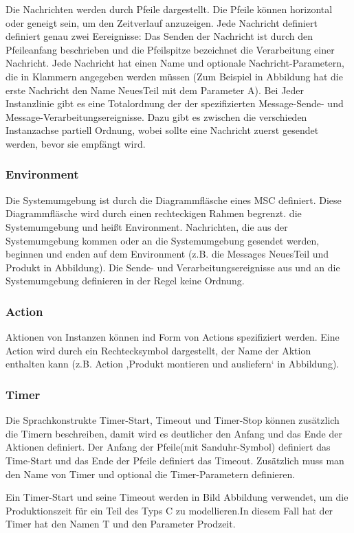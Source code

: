 Die Nachrichten werden durch Pfeile dargestellt. Die Pfeile
können horizontal oder geneigt sein, um den Zeitverlauf
anzuzeigen. 
Jede Nachricht definiert definiert genau zwei Eereignisse: Das Senden der Nachricht ist durch den Pfeileanfang beschrieben und die Pfeilspitze bezeichnet
die Verarbeitung einer Nachricht.
Jede Nachricht hat einen Name und optionale Nachricht-Parametern, die in Klammern angegeben werden müssen (Zum Beispiel in Abbildung hat die erste Nachricht den Name NeuesTeil mit dem Parameter A).
 Bei Jeder Instanzlinie gibt es eine Totalordnung der der spezifizierten
 Message-Sende- und Message-Verarbeitungsereignisse. Dazu gibt es zwischen die verschieden Instanzachse partiell Ordnung, wobei sollte eine Nachricht zuerst gesendet werden, bevor sie empfängt wird. 

\subsubsection{Environment}
Die Systemumgebung ist durch die Diagrammfläsche eines MSC definiert. Diese Diagrammfläsche wird durch einen rechteckigen Rahmen begrenzt.
die Systemumgebung und heißt Environment. Nachrichten,
die aus der Systemumgebung kommen oder an die Systemumgebung
gesendet werden, beginnen und enden auf
dem Environment (z.B. die Messages NeuesTeil und
Produkt in Abbildung). Die Sende- und Verarbeitungsereignisse aus und an die Systemumgebung definieren in der Regel keine Ordnung\cite{MT009}.

\subsubsection{Action}
Aktionen von Instanzen können ind Form von Actions spezifiziert werden.
Eine Action wird durch ein Rechtecksymbol dargestellt, der Name der Aktion enthalten kann (z.B. Action ,Produkt
montieren und ausliefern‘ in Abbildung).
\\
\subsubsection{Timer}
Die Sprachkonstrukte Timer-Start, Timeout und Timer-Stop können zusätzlich die Timern beschreiben, damit wird es deutlicher den Anfang und das Ende der Aktionen definiert.
Der Anfang der Pfeile(mit Sanduhr-Symbol) definiert das Time-Start und das Ende der Pfeile definiert das Timeout. Zusätzlich muss man den Name von Timer und optional die Timer-Parametern definieren.

Ein Timer-Start und seine Timeout werden in Bild Abbildung verwendet, um die Produktionszeit für ein Teil des Typs C zu modellieren.In diesem Fall hat der Timer hat den Namen T und
den Parameter Prodzeit.
